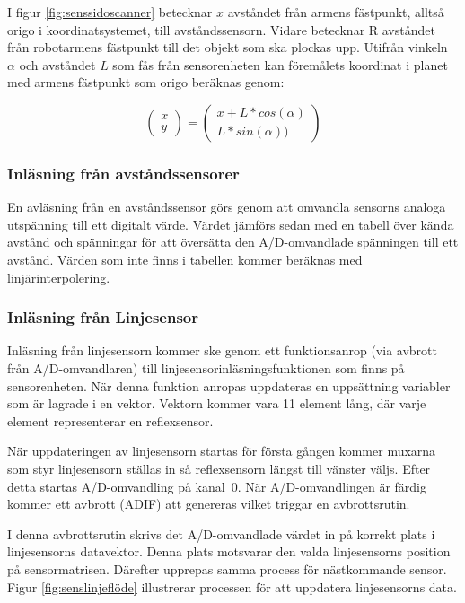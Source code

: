 I figur \ref{fig:senssidoscanner} betecknar $x$ avståndet från armens fästpunkt, alltså origo i koordinatsystemet, till avståndssensorn. Vidare betecknar R avståndet från robotarmens fästpunkt till det objekt som ska plockas upp. Utifrån vinkeln $\alpha$ och avståndet $L$ som fås från sensorenheten kan föremålets koordinat i planet med armens fästpunkt som origo beräknas genom:

$$\begin{pmatrix}
x \\ y
\end{pmatrix}
 = 
\begin{pmatrix}
x+L*cos(\alpha) \\ 
L*sin(\alpha))
\end{pmatrix}$$


\subsubsection{Inläsning från avståndssensorer}
En avläsning från en avståndssensor görs genom att omvandla sensorns analoga utspänning till ett digitalt värde.  Värdet jämförs sedan med en tabell över kända avstånd och spänningar för att översätta den A/D-omvandlade spänningen till ett avstånd. Värden som inte finns i tabellen kommer beräknas med linjärinterpolering. 

\subsubsection{Inläsning från Linjesensor}

Inläsning från linjesensorn kommer ske genom ett funktionsanrop (via avbrott från A/D-omvandlaren) till linjesensorinläsningsfunktionen som finns på sensorenheten. När denna funktion anropas uppdateras en uppsättning variabler som är lagrade i en vektor. Vektorn kommer vara 11 element lång, där varje element representerar en reflexsensor.

När uppdateringen av linjesensorn startas för första gången kommer muxarna som styr linjesensorn ställas in så reflexsensorn längst till vänster väljs. Efter detta startas A/D-omvandling på kanal~0. När A/D-omvandlingen är färdig kommer ett avbrott (ADIF) att genereras vilket triggar en avbrottsrutin.

I denna avbrottsrutin skrivs det A/D-omvandlade värdet in på korrekt plats i linjesensorns datavektor. Denna plats motsvarar den valda linjesensorns position på sensormatrisen. Därefter upprepas samma process för nästkommande sensor. Figur \ref{fig:senslinjeflöde} illustrerar processen för att uppdatera linjesensorns data.

